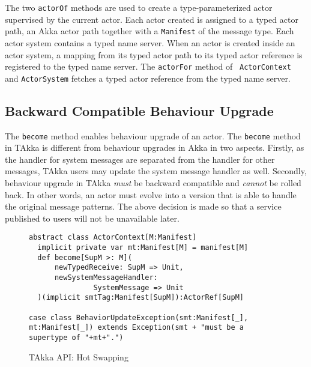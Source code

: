 The two {\tt actorOf} methods are used to create a type-parameterized actor supervised 
by the current actor.  Each actor created is assigned to a typed actor path, 
an Akka actor path together with a {\tt Manifest} of the message type.  Each 
actor system contains a typed name server.  When an actor is created inside an 
actor system, a mapping from its typed actor path to its typed actor reference 
is registered to the typed name server.  The {\tt actorFor} method of {\tt 
ActorContext} and {\tt ActorSystem} fetches a typed actor reference from the 
typed name server.


\subsection{Backward Compatible Behaviour Upgrade}
\label{hot_swapping}

The {\tt become} method enables behaviour upgrade of an 
actor.  The {\tt become} method in TAkka is different from behaviour 
upgrades in  Akka in two aspects.  Firstly, as the handler for system messages 
are separated from the handler for other messages, TAkka users may update the 
system message handler as well.  Secondly, behaviour upgrade in TAkka {\it must} be 
backward compatible and {\it cannot} be rolled back.  In other words, an actor 
must evolve into a version that is able to handle the original
message patterns.  The above decision is made so that a service published to 
users will not be unavailable later.  


\begin{comment}I suggest to enforce backward compatible upgrades whenever
possible to provide better user experience.  If a bad design has to be deprecated,
an error message should be returned, if the received message is a synchronous 
request.  Otherwise, the user cannot tell whether the message is deprecated or lost.}
\end{comment}

\begin{figure}
\label{become}
\begin{lstlisting}
abstract class ActorContext[M:Manifest] 
  implicit private var mt:Manifest[M] = manifest[M]
  def become[SupM >: M](
      newTypedReceive: SupM => Unit,
      newSystemMessageHandler:
               SystemMessage => Unit
  )(implicit smtTag:Manifest[SupM]):ActorRef[SupM] 

case class BehaviorUpdateException(smt:Manifest[_], mt:Manifest[_]) extends Exception(smt + "must be a supertype of "+mt+".")
\end{lstlisting}
\caption{TAkka API: Hot Swapping}
\end{figure}

